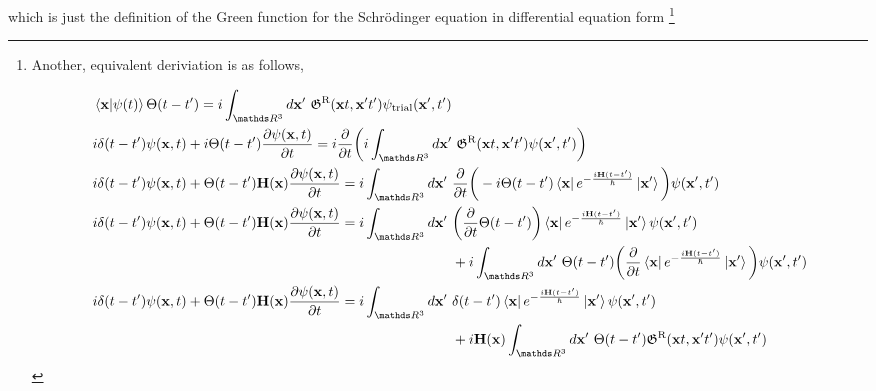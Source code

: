 which is just the definition of the Green function for the Schr\"odinger equation in differential equation form
\iffalse\footnote{Another, equivalent deriviation is as follows,

\begin{equation}
    \begin{split}
        &\bra{{\bf x}} \ket{\psi(t)} \Theta(t-t') = i \int_{\R^3} d{\bf x}' \blanky \mathfrak{G}^{\textnormal{R}}({\bf x}t, {\bf x}'t') \psi_{\textnormal{trial}}({\bf x}', t') \\
        &i \delta(t-t') \psi({\bf x}, t) + i \Theta(t-t') \frac{\partial \psi({\bf x}, t)}{\partial t} = i \frac{\partial}{\partial t} \bigg(i \int_{\R^3} d{\bf x}' \blanky \mathfrak{G}^{\textnormal{R}}({\bf x}t, {\bf x}'t') \psi({\bf x}', t') \bigg) \\
        & i \delta(t-t') \psi({\bf x}, t) + \Theta(t-t') {\bf H}({\bf x}) \frac{\partial \psi({\bf x}, t)}{\partial t} = i \int_{\R^3} d{\bf x}' \blanky \frac{\partial}{\partial t} \bigg( - i \Theta(t-t') \bra{{\bf x}} e^{-\frac{i {\bf H} (t-t')}{\hbar}} \ket{{\bf x}'}\bigg) \psi({\bf x}', t') \\
        &  i \delta(t-t') \psi({\bf x}, t) + \Theta(t-t') {\bf H}({\bf x}) \frac{\partial \psi({\bf x}, t)}{\partial t} = i \int_{\R^3} d{\bf x}' \blanky \bigg(\frac{\partial}{\partial t} \Theta(t-t')\bigg) \bra{{\bf x}} e^{-\frac{i {\bf H} (t-t')}{\hbar}} \ket{{\bf x}'} \psi({\bf x}', t') \\
        & \blanky\blanky\blanky\blanky\blanky\blanky\blanky\blanky\blanky\blanky\blanky\blanky\blanky\blanky\blanky\blanky\blanky\blanky\blanky\blanky\blanky\blanky\blanky\blanky\blanky\blanky\blanky\blanky\blanky\blanky\blanky\blanky \blanky\blanky\blanky\blanky\blanky\blanky\blanky\blanky\blanky\blanky\blanky\blanky\blanky\blanky\blanky\blanky\blanky\blanky\blanky\blanky\blanky\blanky\blanky\blanky\blanky\blanky\blanky\blanky\blanky\blanky\blanky\blanky\blanky\blanky\blanky\blanky\blanky\blanky\blanky\blanky\blanky\blanky\blanky\blanky\blanky + i \int_{\R^3} d{\bf x}' \blanky \Theta(t-t') \bigg(\frac{\partial}{\partial t} \bra{{\bf x}} e^{-\frac{i {\bf H} (t-t')}{\hbar}} \ket{{\bf x}'} \bigg) \psi({\bf x}', t')\\
        &  i \delta(t-t') \psi({\bf x}, t) + \Theta(t-t') {\bf H}({\bf x}) \frac{\partial \psi({\bf x}, t)}{\partial t} = i \int_{\R^3} d{\bf x}' \blanky \delta(t-t') \bra{{\bf x}} e^{-\frac{i {\bf H} (t-t')}{\hbar}} \ket{{\bf x}'} \psi({\bf x}', t') \\
        & \blanky\blanky\blanky\blanky\blanky\blanky\blanky\blanky\blanky\blanky\blanky\blanky\blanky\blanky\blanky\blanky\blanky\blanky\blanky\blanky\blanky\blanky\blanky\blanky\blanky\blanky\blanky\blanky\blanky\blanky\blanky\blanky \blanky\blanky\blanky\blanky\blanky\blanky\blanky\blanky\blanky\blanky\blanky\blanky\blanky\blanky\blanky\blanky\blanky\blanky\blanky\blanky\blanky\blanky\blanky\blanky\blanky\blanky\blanky\blanky\blanky\blanky\blanky\blanky\blanky\blanky\blanky\blanky\blanky\blanky\blanky\blanky\blanky\blanky\blanky\blanky\blanky + i {\bf H}({\bf x}) \int_{\R^3} d{\bf x}' \blanky \Theta(t-t') \mathfrak{G}^{\textnormal{R}}({\bf x}t, {\bf x}'t') \psi({\bf x}', t')\\

\end{split}
\end{equation}}

